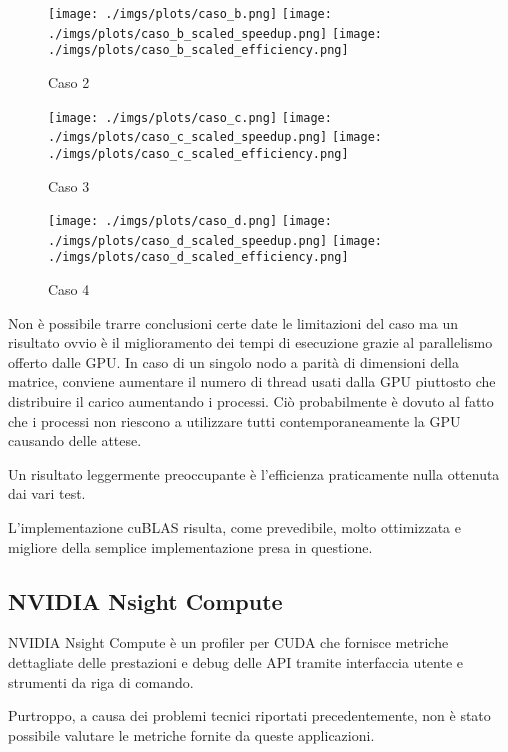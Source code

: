 \begin{figure}[h]
    \centering
    \texttt{[image: ./imgs/plots/caso\_b.png]}
    \texttt{[image: ./imgs/plots/caso\_b\_scaled\_speedup.png]}
    \texttt{[image: ./imgs/plots/caso\_b\_scaled\_efficiency.png]}
    \caption{Caso 2}
\end{figure}

\begin{figure}[h]
    \centering
    \texttt{[image: ./imgs/plots/caso\_c.png]}
    \texttt{[image: ./imgs/plots/caso\_c\_scaled\_speedup.png]}
    \texttt{[image: ./imgs/plots/caso\_c\_scaled\_efficiency.png]}
    \caption{Caso 3}
\end{figure}

\begin{figure}[h]
    \centering
    \texttt{[image: ./imgs/plots/caso\_d.png]}
    \texttt{[image: ./imgs/plots/caso\_d\_scaled\_speedup.png]}
    \texttt{[image: ./imgs/plots/caso\_d\_scaled\_efficiency.png]}
    \caption{Caso 4}
\end{figure}

Non è possibile trarre conclusioni certe date le limitazioni del caso ma un risultato ovvio è il miglioramento dei tempi di esecuzione grazie al parallelismo offerto dalle GPU.
In caso di un singolo nodo a parità di dimensioni della matrice, conviene aumentare il numero di thread usati dalla GPU piuttosto che distribuire il carico aumentando i processi. Ciò probabilmente è dovuto al fatto che i processi non riescono a utilizzare tutti contemporaneamente la GPU causando delle attese.

Un risultato leggermente preoccupante è l'efficienza praticamente nulla ottenuta dai vari test.

L'implementazione cuBLAS risulta, come prevedibile, molto ottimizzata e migliore della semplice implementazione presa in questione.

\subsection{NVIDIA Nsight Compute}

NVIDIA Nsight Compute è un profiler per CUDA che fornisce metriche dettagliate delle prestazioni e debug delle API tramite interfaccia utente e strumenti da riga di comando.

Purtroppo, a causa dei problemi tecnici riportati precedentemente, non è stato possibile valutare le metriche fornite da queste applicazioni.
